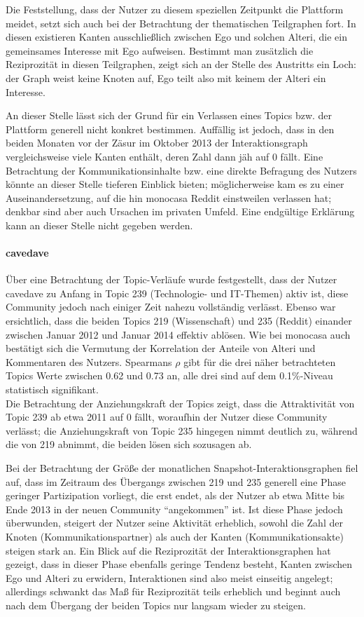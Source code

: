 \documentclass[11pt,a4paper,twoside]{article}
\let\oldpar\paragraph
\renewcommand{\paragraph}{\oldpar*}
\begin{document}
Die Feststellung, dass der Nutzer zu diesem speziellen Zeitpunkt die
Plattform meidet, setzt sich auch bei der Betrachtung der thematischen
Teilgraphen fort. In diesen existieren Kanten ausschließlich zwischen
Ego und solchen Alteri, die ein gemeinsames Interesse mit Ego aufweisen.
Bestimmt man zusätzlich die Reziprozität in diesen Teilgraphen, zeigt
sich an der Stelle des Austritts ein Loch: der Graph weist keine Knoten
auf, Ego teilt also mit keinem der Alteri ein Interesse.

An dieser Stelle lässt sich der Grund für ein Verlassen eines Topics
bzw. der Plattform generell nicht konkret bestimmen. Auffällig ist
jedoch, dass in den beiden Monaten vor der Zäsur im Oktober 2013 der
Interaktionsgraph vergleichsweise viele Kanten enthält, deren Zahl dann
jäh auf 0 fällt. Eine Betrachtung der Kommunikationsinhalte bzw. eine
direkte Befragung des Nutzers könnte an dieser Stelle tieferen Einblick
bieten; möglicherweise kam es zu einer Auseinandersetzung, auf die hin
monocasa Reddit einstweilen verlassen hat; denkbar sind aber auch
Ursachen im privaten Umfeld. Eine endgültige Erklärung kann an dieser
Stelle nicht gegeben werden.

\hypertarget{cavedave-1}{%
\paragraph{cavedave}\label{cavedave-1}}

Über eine Betrachtung der Topic-Verläufe wurde festgestellt, dass der
Nutzer cavedave zu Anfang in Topic 239 (Technologie- und IT-Themen)
aktiv ist, diese Community jedoch nach einiger Zeit nahezu vollständig
verlässt. Ebenso war ersichtlich, dass die beiden Topics 219
(Wissenschaft) und 235 (Reddit) einander zwischen Januar 2012 und Januar
2014 effektiv ablösen. Wie bei monocasa auch bestätigt sich die
Vermutung der Korrelation der Anteile von Alteri und Kommentaren des
Nutzers. Spearmans \(\rho\) gibt für die drei näher betrachteten Topics
Werte zwischen 0.62 und 0.73 an, alle drei sind auf dem 0.1\%-Niveau
statistisch signifikant.\\
Die Betrachtung der Anziehungskraft der Topics zeigt, dass die
Attraktivität von Topic 239 ab etwa 2011 auf 0 fällt, woraufhin der
Nutzer diese Community verlässt; die Anziehungskraft von Topic 235
hingegen nimmt deutlich zu, während die von 219 abnimmt, die beiden
lösen sich sozusagen ab.

Bei der Betrachtung der Größe der monatlichen
Snapshot-Interaktionsgraphen fiel auf, dass im Zeitraum des Übergangs
zwischen 219 und 235 generell eine Phase geringer Partizipation
vorliegt, die erst endet, als der Nutzer ab etwa Mitte bis Ende 2013 in
der neuen Community \enquote{angekommen} ist. Ist diese Phase jedoch
überwunden, steigert der Nutzer seine Aktivität erheblich, sowohl die
Zahl der Knoten (Kommunikationspartner) als auch der Kanten
(Kommunikationsakte) steigen stark an. Ein Blick auf die Reziprozität
der Interaktionsgraphen hat gezeigt, dass in dieser Phase ebenfalls
geringe Tendenz besteht, Kanten zwischen Ego und Alteri zu erwidern,
Interaktionen sind also meist einseitig angelegt; allerdings schwankt
das Maß für Reziprozität teils erheblich und beginnt auch nach dem
Übergang der beiden Topics nur langsam wieder zu steigen.
\end{document}
